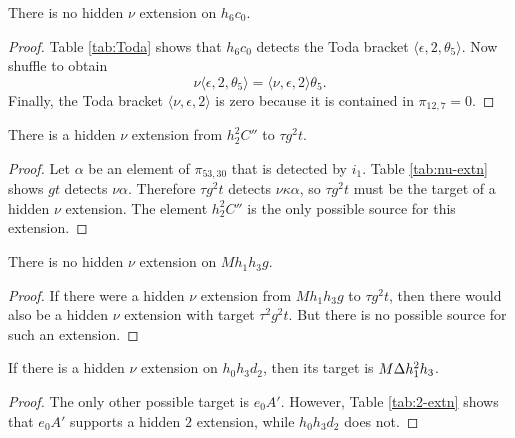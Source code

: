 \begin{lemma}
\label{lem:nu-h6c0}
There is no hidden $\nu$ extension on $h_6 c_0$.
\end{lemma}

\begin{proof}
Table \ref{tab:Toda} shows that $h_6 c_0$ detects the Toda bracket
$\langle \epsilon, 2, \theta_5 \rangle$.  Now shuffle to obtain
\[
\nu \langle \epsilon, 2, \theta_5 \rangle = 
\langle \nu, \epsilon, 2 \rangle \theta_5.
\]
Finally, the Toda bracket $\langle \nu, \epsilon, 2 \rangle$ is 
zero because it is contained in $\pi_{12,7} = 0$.
\end{proof}

\begin{lemma}
\label{lem:nu-h2^2C''}
There is a hidden $\nu$ extension from $h_2^2 C''$ to $\tau g^2 t$.
\end{lemma}

\begin{proof}
Let $\alpha$ be an element of $\pi_{53,30}$ that is detected by $i_1$.
Table \ref{tab:nu-extn} shows $g t$ detects $\nu \alpha$.
Therefore $\tau g^2 t$ detects $\nu \kappa \alpha$,
so $\tau g^2 t$ must be the target of a hidden $\nu$ extension.
The element $h_2^2 C''$ is the only
possible source for this extension.
\end{proof}

\begin{lemma}
\label{lem:nu-Mh1h3g}
There is no hidden $\nu$ extension on $M h_1 h_3 g$.
\end{lemma}

\begin{proof}
If there were a hidden $\nu$ extension from $M h_1 h_3 g$ to
$\tau g^2 t$, then there would also be a hidden $\nu$ extension
with target $\tau^2 g^2 t$.  But there is no possible source
for such an extension.
\end{proof}

\begin{lemma}
\label{lem:nu-h0h3d2}
If there is a hidden $\nu$ extension on $h_0 h_3 d_2$, then
its target is $M \Delta h_1^2 h_3$.
\end{lemma}

\begin{proof}
The only other possible target is $e_0 A'$.
However, Table \ref{tab:2-extn} shows that $e_0 A'$ supports
a hidden $2$ extension, while $h_0 h_3 d_2$ does not.
\end{proof}

